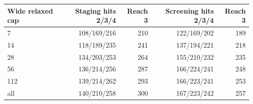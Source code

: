 \begin{tabular}{lrrrr}
\toprule
Wide relaxed cap & Staging hits 2/3/4 & Reach 3 & Screening hits 2/3/4 & Reach 3 \\
\midrule
7 & 108/169/216 & 210 & 122/169/202 & 189 \\
14 & 118/189/235 & 241 & 137/194/221 & 218 \\
28 & 134/203/253 & 264 & 155/210/232 & 235 \\
56 & 136/214/256 & 287 & 166/224/241 & 248 \\
112 & 139/214/262 & 293 & 166/223/241 & 253 \\
all & 140/210/258 & 300 & 167/223/242 & 257 \\
\bottomrule
\end{tabular}

